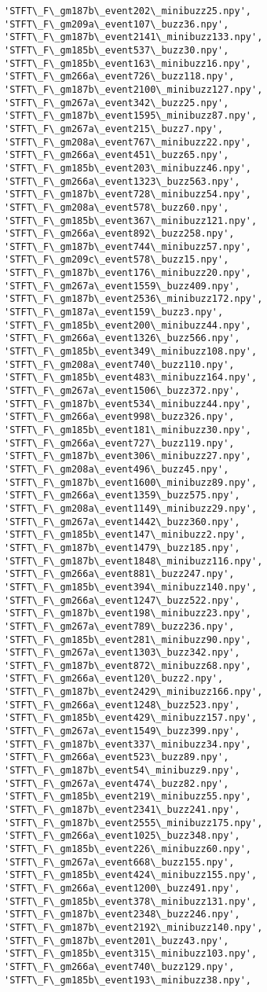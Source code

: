 \documentclass[11pt]{article}
\begin{document}
\begin{Verbatim}[commandchars=\\\{\}]
'STFT\_F\_gm187b\_event202\_minibuzz25.npy', 'STFT\_F\_gm209a\_event107\_buzz36.npy', 'STFT\_F\_gm187b\_event2141\_minibuzz133.npy', 'STFT\_F\_gm185b\_event537\_buzz30.npy', 'STFT\_F\_gm185b\_event163\_minibuzz16.npy', 'STFT\_F\_gm266a\_event726\_buzz118.npy', 'STFT\_F\_gm187b\_event2100\_minibuzz127.npy', 'STFT\_F\_gm267a\_event342\_buzz25.npy', 'STFT\_F\_gm187b\_event1595\_minibuzz87.npy', 'STFT\_F\_gm267a\_event215\_buzz7.npy', 'STFT\_F\_gm208a\_event767\_minibuzz22.npy', 'STFT\_F\_gm266a\_event451\_buzz65.npy', 'STFT\_F\_gm185b\_event203\_minibuzz46.npy', 'STFT\_F\_gm266a\_event1323\_buzz563.npy', 'STFT\_F\_gm187b\_event728\_minibuzz54.npy', 'STFT\_F\_gm208a\_event578\_buzz60.npy', 'STFT\_F\_gm185b\_event367\_minibuzz121.npy', 'STFT\_F\_gm266a\_event892\_buzz258.npy', 'STFT\_F\_gm187b\_event744\_minibuzz57.npy', 'STFT\_F\_gm209c\_event578\_buzz15.npy', 'STFT\_F\_gm187b\_event176\_minibuzz20.npy', 'STFT\_F\_gm267a\_event1559\_buzz409.npy', 'STFT\_F\_gm187b\_event2536\_minibuzz172.npy', 'STFT\_F\_gm187a\_event159\_buzz3.npy', 'STFT\_F\_gm185b\_event200\_minibuzz44.npy', 'STFT\_F\_gm266a\_event1326\_buzz566.npy', 'STFT\_F\_gm185b\_event349\_minibuzz108.npy', 'STFT\_F\_gm208a\_event740\_buzz110.npy', 'STFT\_F\_gm185b\_event483\_minibuzz164.npy', 'STFT\_F\_gm267a\_event1506\_buzz372.npy', 'STFT\_F\_gm187b\_event534\_minibuzz44.npy', 'STFT\_F\_gm266a\_event998\_buzz326.npy', 'STFT\_F\_gm185b\_event181\_minibuzz30.npy', 'STFT\_F\_gm266a\_event727\_buzz119.npy', 'STFT\_F\_gm187b\_event306\_minibuzz27.npy', 'STFT\_F\_gm208a\_event496\_buzz45.npy', 'STFT\_F\_gm187b\_event1600\_minibuzz89.npy', 'STFT\_F\_gm266a\_event1359\_buzz575.npy', 'STFT\_F\_gm208a\_event1149\_minibuzz29.npy', 'STFT\_F\_gm267a\_event1442\_buzz360.npy', 'STFT\_F\_gm185b\_event147\_minibuzz2.npy', 'STFT\_F\_gm187b\_event1479\_buzz185.npy', 'STFT\_F\_gm187b\_event1848\_minibuzz116.npy', 'STFT\_F\_gm266a\_event881\_buzz247.npy', 'STFT\_F\_gm185b\_event394\_minibuzz140.npy', 'STFT\_F\_gm266a\_event1247\_buzz522.npy', 'STFT\_F\_gm187b\_event198\_minibuzz23.npy', 'STFT\_F\_gm267a\_event789\_buzz236.npy', 'STFT\_F\_gm185b\_event281\_minibuzz90.npy', 'STFT\_F\_gm267a\_event1303\_buzz342.npy', 'STFT\_F\_gm187b\_event872\_minibuzz68.npy', 'STFT\_F\_gm266a\_event120\_buzz2.npy', 'STFT\_F\_gm187b\_event2429\_minibuzz166.npy', 'STFT\_F\_gm266a\_event1248\_buzz523.npy', 'STFT\_F\_gm185b\_event429\_minibuzz157.npy', 'STFT\_F\_gm267a\_event1549\_buzz399.npy', 'STFT\_F\_gm187b\_event337\_minibuzz34.npy', 'STFT\_F\_gm266a\_event523\_buzz89.npy', 'STFT\_F\_gm187b\_event54\_minibuzz9.npy', 'STFT\_F\_gm267a\_event474\_buzz82.npy', 'STFT\_F\_gm185b\_event219\_minibuzz55.npy', 'STFT\_F\_gm187b\_event2341\_buzz241.npy', 'STFT\_F\_gm187b\_event2555\_minibuzz175.npy', 'STFT\_F\_gm266a\_event1025\_buzz348.npy', 'STFT\_F\_gm185b\_event226\_minibuzz60.npy', 'STFT\_F\_gm267a\_event668\_buzz155.npy', 'STFT\_F\_gm185b\_event424\_minibuzz155.npy', 'STFT\_F\_gm266a\_event1200\_buzz491.npy', 'STFT\_F\_gm185b\_event378\_minibuzz131.npy', 'STFT\_F\_gm187b\_event2348\_buzz246.npy', 'STFT\_F\_gm187b\_event2192\_minibuzz140.npy', 'STFT\_F\_gm187b\_event201\_buzz43.npy', 'STFT\_F\_gm185b\_event315\_minibuzz103.npy', 'STFT\_F\_gm266a\_event740\_buzz129.npy', 'STFT\_F\_gm185b\_event193\_minibuzz38.npy', 
\end{Verbatim}
\end{document}

